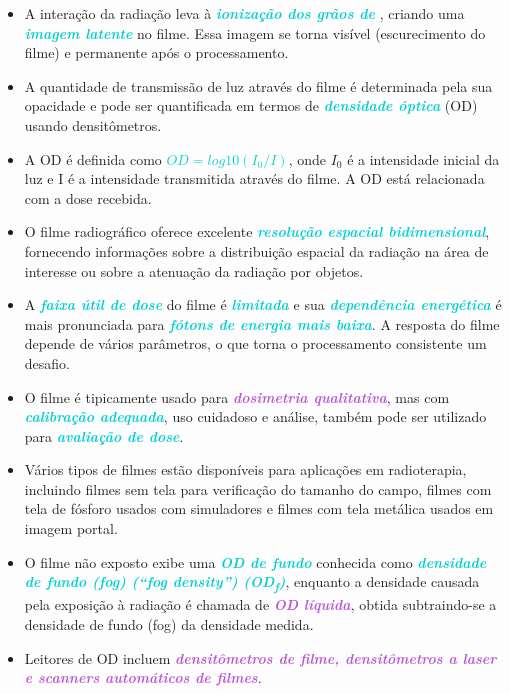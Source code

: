 \documentclass[11pt,a4paper]{article}
\newcounter{exemplo}
\begin{document}
	\begin{exemplo}
		\begin{itemize}
			\item A interação da radiação leva à \textcolor{DarkTurquoise}{\textit{\textbf{ionização dos grãos de }}}, criando uma \textcolor{DarkTurquoise}{\textit{\textbf{imagem latente}}} no filme. Essa imagem se torna visível (escurecimento do filme) e permanente após o processamento.
			\item A quantidade de transmissão de luz através do filme é determinada pela sua opacidade e pode ser quantificada em termos de \textcolor{DarkTurquoise}{\textit{\textbf{densidade óptica}}} (OD) usando densitômetros.
			\item A OD é definida como \textcolor{DarkTurquoise}{\textit{\textbf{$OD = log10 (I_0/I)$}}}, onde $I_0$ é a intensidade inicial da luz e I é a intensidade transmitida através do filme. A OD está relacionada com a dose recebida.
			\item O filme radiográfico oferece excelente \textcolor{DarkTurquoise}{\textit{\textbf{resolução espacial bidimensional}}}, fornecendo informações sobre a distribuição espacial da radiação na área de interesse ou sobre a atenuação da radiação por objetos.
			\item A \textcolor{DarkTurquoise}{\textit{\textbf{faixa útil de dose}}} do filme é \textcolor{DarkTurquoise}{\textit{\textbf{limitada}}} e sua \textcolor{DarkTurquoise}{\textit{\textbf{dependência energética}}} é mais pronunciada para \textcolor{DarkTurquoise}{\textit{\textbf{fótons de energia mais baixa}}}. A resposta do filme depende de vários parâmetros, o que torna o processamento consistente um desafio.
			\item O filme é tipicamente usado para \textcolor{MediumOrchid}{\textit{\textbf{dosimetria qualitativa}}}, mas com \textcolor{DarkTurquoise}{\textit{\textbf{calibração adequada}}}, uso cuidadoso e análise, também pode ser utilizado para \textcolor{DarkTurquoise}{\textit{\textbf{avaliação de dose}}}.
			\item Vários tipos de filmes estão disponíveis para aplicações em radioterapia, incluindo filmes sem tela para verificação do tamanho do campo, filmes com tela de fósforo usados com simuladores e filmes com tela metálica usados em imagem portal.
			\item O filme não exposto exibe uma \textcolor{DarkTurquoise}{\textit{\textbf{OD de fundo}}} conhecida como \textcolor{DarkTurquoise}{\textit{\textbf{densidade de fundo (fog) (``fog density'') (OD\textsubscript{f})}}}, enquanto a densidade causada pela exposição à radiação é chamada de \textcolor{MediumOrchid}{\textit{\textbf{OD líquida}}}, obtida subtraindo-se a densidade de fundo (fog) da densidade medida.
			\item Leitores de OD incluem \textcolor{MediumOrchid}{\textit{\textbf{densitômetros de filme, densitômetros a laser e scanners automáticos de filmes}}}.
		\end{itemize}
	\end{exemplo}
\end{document}
